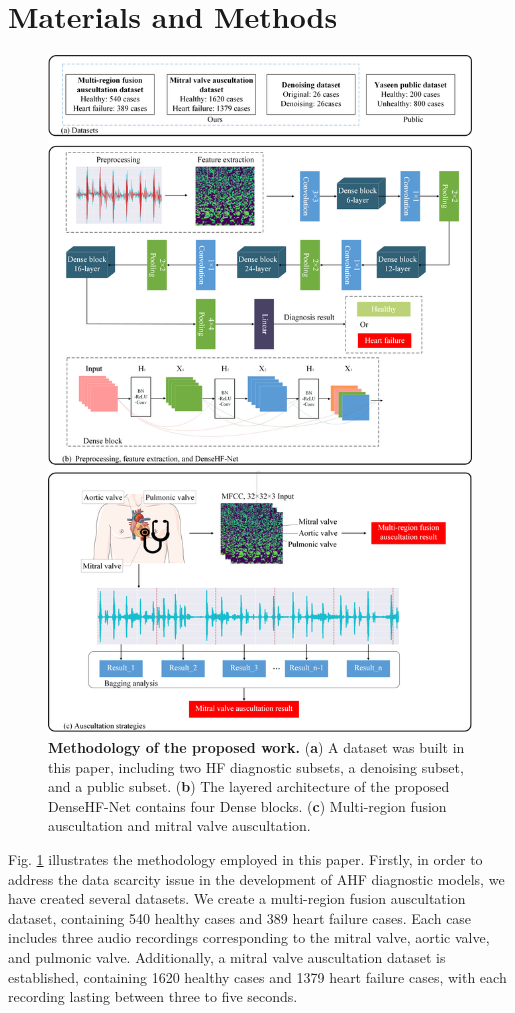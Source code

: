 \section{Materials and Methods}\label{Materials and Methods}
\begin{figure}[htbp]
    \centering
    \includegraphics[width=0.8\linewidth]{figs/methods/all.png}
    \caption{\textbf{Methodology of the proposed work.} (\textbf{a}) A dataset was built in this paper, including two HF diagnostic subsets, a denoising subset, and a public subset. (\textbf{b}) The layered architecture of the proposed DenseHF-Net contains four Dense blocks. (\textbf{c}) Multi-region fusion auscultation and mitral valve auscultation.}
	\label{FIG:Methodology}
\end{figure}
Fig. \ref{FIG:Methodology} illustrates the methodology employed in this paper. Firstly, in order to address the data scarcity issue in the development of AHF diagnostic models, we have created several datasets. We create a multi-region fusion auscultation dataset, containing 540 healthy cases and 389 heart failure cases. Each case includes three audio recordings corresponding to the mitral valve, aortic valve, and pulmonic valve. Additionally, a mitral valve auscultation dataset is established, containing 1620 healthy cases and 1379 heart failure cases, with each recording lasting between three to five seconds.

